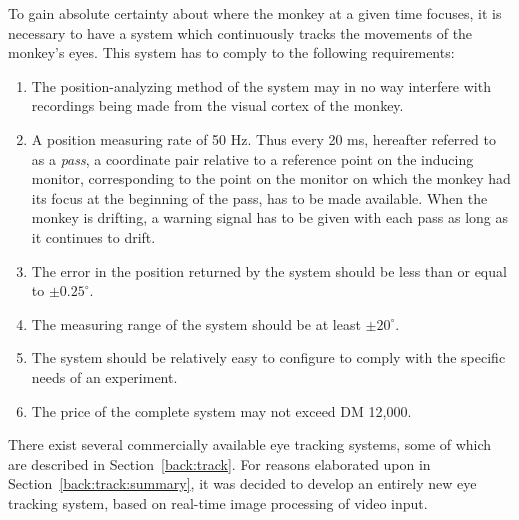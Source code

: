 To gain absolute certainty about where the monkey at a given time
focuses, it is necessary to have a system which continuously tracks
the movements of the monkey's eyes.  This system has to comply to the
following requirements:
\begin{enumerate}
\item The position-analyzing method of the system may in no way
  interfere with recordings being made from the visual cortex of the
  monkey.
\item\label{req:first}A position measuring rate of 50 Hz.  Thus every
  20 ms, hereafter referred to as a {\em pass\/}, a coordinate pair
  relative to a reference point on the inducing monitor, corresponding
  to the point on the monitor on which the monkey had its focus at the
  beginning of the pass, has to be made available.  When the monkey is
  drifting, a warning signal has to be given with each pass as long as
  it continues to drift.
\item\label{req:2}The error in the position returned by the system
  should be less than or equal to $\pm 0.25^{\circ}$.
\item\label{req:3}The measuring range of the system should be at least
  $\pm 20^{\circ}$.
\item\label{req:4}The system should be relatively easy to configure to
  comply with the specific needs of an experiment.
\item\label{req:last}The price of the complete system may not exceed
  DM 12,000.
\end{enumerate}

There exist several commercially available eye tracking systems, some
of which are described in Section~\ref{back:track}.  For reasons
elaborated upon in Section~\ref{back:track:summary}, it was decided to
develop an entirely new eye tracking system, based on real-time image
processing of video input.
